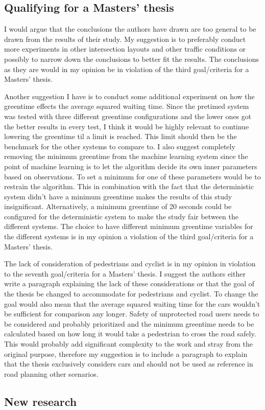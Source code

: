 \documentclass[10pt, a4paper]{article}
\begin{document}
\subsection{Qualifying for a Masters' thesis}
I would argue that the conclusions the authors have drawn are too general to be drawn from the results of their study. My suggestion is to
preferably conduct more experiments in other intersection layouts and other traffic conditions or possibly to narrow down the conclusions
to better fit the results. The conclusions as they are would in my opinion be in violation of the third goal/criteria for a Masters' thesis.

Another suggestion I have is to conduct some additional experiment on how the greentime effects the average squared waiting time. Since the
pretimed system was tested with three different greentime configurations and the lower ones got the better results in every test, I think it 
would be highly relevant to continue lowering the greentime til a limit is reached. This limit should then be the benchmark for the other systems
to compare to. I also suggest completely removing the minimum greentime from the machine learning system since the point of machine learning is
to let the algorithm decide its own inner parameters based on observations. To set a minimum for one of these parameters would be to restrain
the algorithm. This in combination with the fact that the deterministic system didn't have a minimum greentime makes the results of this study
insignificant. Alternatively, a minimum greentime of 20 seconds could be configured for the deterministic system to make the study fair
between the different systems. The choice to have different minimum greentime variables for the different systems is in my opinion a violation
of the third goal/criteria for a Masters' thesis.

The lack of consideration of pedestrians and cyclist is in my opinion in violation to the seventh goal/criteria for a Masters' thesis. I suggest
the authors either write a paragraph explaining the lack of these considerations or that the goal of the thesis be changed to accommodate for
pedestrians and cyclist. To change the goal would also mean that the average squared waiting time for the cars wouldn't be sufficient for comparison
any longer. Safety of unprotected road users needs to be considered and probably prioritized and the minimum greentime needs to be calculated based
on how long it would take a pedestrian to cross the road safely. This would probably add significant complexity to the work and stray from the original
purpose, therefore my suggestion is to include a paragraph to explain that the thesis exclusively considers cars and should not be used as reference
in road planning other scenarios.

\subsection{New research}




\end{document}
